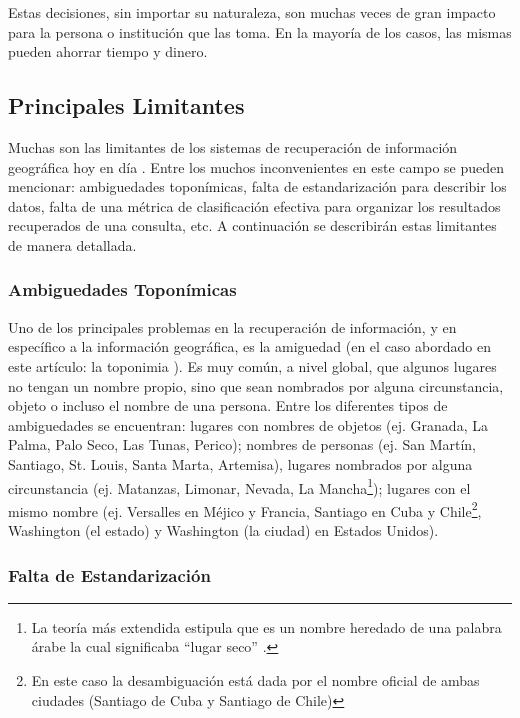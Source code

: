 \documentclass{llncs}
\begin{document}
Estas decisiones, sin importar su naturaleza, son muchas veces de gran impacto
para la persona o institución que las toma. En la mayoría de los casos,
las mismas pueden ahorrar tiempo y dinero.

\subsection{Principales Limitantes}\label{sec:limit}

Muchas son las limitantes de los sistemas de recuperación de información
geográfica hoy en día \cite{purves2011,purves2004}. Entre los muchos
inconvenientes en este campo se pueden mencionar: ambiguedades toponímicas,
falta de estandarización para describir los datos, falta de una métrica de
clasificación efectiva para organizar los resultados recuperados de una
consulta, etc. A continuación se describirán estas limitantes de
manera detallada.

\subsubsection{Ambiguedades Toponímicas}\label{sec:ambig}

Uno de los principales problemas en la recuperación de información, y en
específico a la información geográfica, es la amiguedad (en el caso abordado en
este artículo: la toponimia \cite{buscaldi2009}). Es muy común, a nivel global,
que algunos lugares no tengan un nombre propio, sino que sean nombrados por
alguna circunstancia, objeto o incluso el nombre de una persona. Entre los
diferentes tipos de ambiguedades se encuentran: lugares con nombres de objetos (ej.
Granada, La Palma, Palo Seco, Las Tunas, Perico); nombres de personas
(ej. San Martín, Santiago, St. Louis, Santa Marta, Artemisa), lugares nombrados
por alguna circunstancia (ej. Matanzas, Limonar, Nevada, La Mancha\footnote{La
teoría más extendida estipula que es un nombre heredado de una palabra árabe la
cual significaba ``lugar seco'' \cite{laMancha}.}); lugares con el mismo nombre
(ej. Versalles en Méjico y Francia, Santiago en Cuba y Chile\footnote{En este
caso la desambiguación está dada por el nombre oficial de ambas ciudades
(Santiago de Cuba y Santiago de Chile)}, Washington (el estado) y Washington (la
ciudad) en Estados Unidos).

\subsubsection{Falta de Estandarización}\label{sec:estand}
\end{document}
